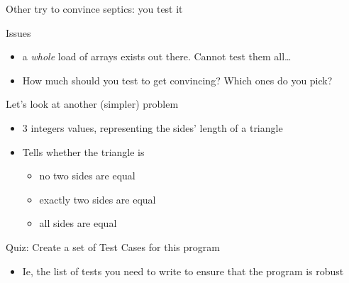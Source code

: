 \begin{frame}{Other try to convince septics: \alert{you test it}}
  \begin{block}{Issues} 
    \begin{itemize}
    \item a \textit{whole} load of arrays exists out there. Cannot test them
      all\ldots
     \item How much should you test to get convincing?
       Which ones do you pick?
   \end{itemize}
  \end{block}

  \begin{block}{Let's look at another (simpler) problem}
    \begin{itemize}
    \item {} 3 integers values, representing the sides'
      length of a triangle
    \item {} Tells whether the triangle is
      \begin{itemize}
      \item {} no two sides are equal
      \item {} exactly two sides are equal
      \item {} all sides are equal
      \end{itemize}
    \end{itemize}
  \end{block}

  \begin{alertblock}{Quiz: Create a set of Test Cases for this program}
    \begin{itemize}
    \item Ie, the list of tests you need to write to ensure that the program is robust
    \end{itemize}
  \end{alertblock}
\end{frame}
